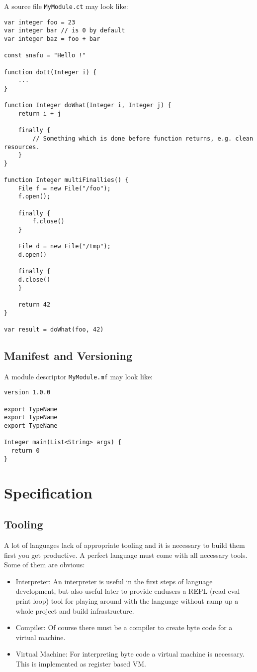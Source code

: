 \documentclass[a4paper,12pt]{article}
\begin{document}
A source file \texttt{MyModule.ct} may look like:

\begin{verbatim}
var integer foo = 23
var integer bar // is 0 by default
var integer baz = foo + bar

const snafu = "Hello !"

function doIt(Integer i) {
    ...
}

function Integer doWhat(Integer i, Integer j) {
    return i + j
    
    finally {
    	// Something which is done before function returns, e.g. clean resources.
    }
}

function Integer multiFinallies() {
    File f = new File("/foo");
    f.open();
    
    finally {
        f.close()
    }
    
    File d = new File("/tmp");
    d.open()
    
    finally {
    d.close()
    }
    
    return 42
}

var result = doWhat(foo, 42)	
\end{verbatim}

\subsection{Manifest and Versioning}

A module descriptor \texttt{MyModule.mf} may look like:

\begin{verbatim}
version 1.0.0

export TypeName
export TypeName
export TypeName

Integer main(List<String> args) {
  return 0
}
\end{verbatim}

\section{Specification}

\subsection{Tooling}

A lot of languages lack of appropriate tooling and it is necessary to build them first you get productive. A perfect language must come with all necessary tools. Some of them are obvious:

\begin{itemize}
	\item Interpreter: An interpreter is useful in the first steps of language development, but also useful later to provide endusers a REPL (read eval print loop) tool for playing around with the language without ramp up a whole project and build infrastructure.
	\item Compiler: Of course there must be a compiler to create byte code for a virtual machine.
	\item Virtual Machine: For interpreting byte code a virtual machine is necessary. This is implemented as register based VM.
\end{itemize}
\end{document}
